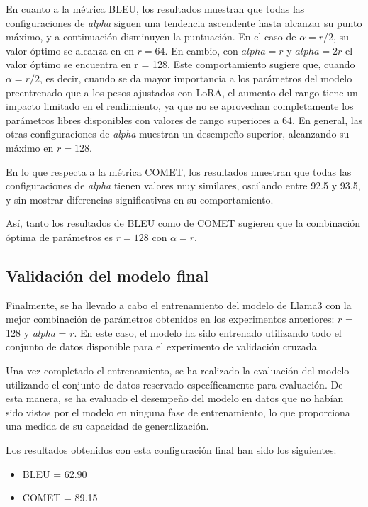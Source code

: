 \documentclass[11pt,spanish,listoffigures,listoftables]{tfgetsinf}
\begin{document}
En cuanto a la métrica BLEU, los resultados muestran que todas las configuraciones de \textit{alpha} siguen una tendencia ascendente hasta alcanzar su punto máximo, y a continuación disminuyen la puntuación. En el caso de $\alpha = r/2$, su valor óptimo se alcanza en en $r = 64$. En cambio, con $alpha = r$ y $alpha = 2r$ el valor óptimo se encuentra en r = 128. Este comportamiento sugiere que, cuando $\alpha = r/2$, es decir, cuando se da mayor importancia a los parámetros del modelo preentrenado que a los pesos ajustados con LoRA, el aumento del rango tiene un impacto limitado en el rendimiento, ya que no se aprovechan completamente los parámetros libres disponibles con valores de rango superiores a 64. En general, las otras configuraciones de \textit{alpha} muestran un desempeño superior, alcanzando su máximo en $r = 128$.

En lo que respecta a la métrica COMET, los resultados muestran que todas las configuraciones de \textit{alpha} tienen valores muy similares, oscilando entre 92.5 y 93.5, y sin mostrar diferencias significativas en su comportamiento.

Así, tanto los resultados de BLEU como de COMET sugieren que la combinación óptima de parámetros es $r = 128$ con $\alpha = r$.

\subsection{Validación del modelo final}

Finalmente, se ha llevado a cabo el entrenamiento del modelo de Llama3 con la mejor combinación de parámetros obtenidos en los experimentos anteriores: $r$ = 128 y \textit{alpha} = $r$. En este caso, el modelo ha sido entrenado utilizando todo el conjunto de datos disponible para el experimento de validación cruzada.

Una vez completado el entrenamiento, se ha realizado la evaluación del modelo utilizando el conjunto de datos reservado específicamente para evaluación. De esta manera, se ha evaluado el desempeño del modelo en datos que no habían sido vistos por el modelo en ninguna fase de entrenamiento, lo que proporciona una medida de su capacidad de generalización.

Los resultados obtenidos con esta configuración final han sido los siguientes:

\begin{itemize}
	\item BLEU = 62.90
	\item COMET = 89.15
\end{itemize}
\end{document}
